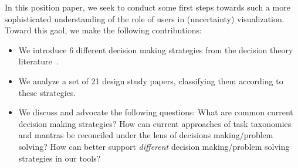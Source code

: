 In this position paper, we seek to conduct some first steps towards such a more sophisticated understanding of the role of users in 
(uncertainty) visualization. Toward this gaol, we make the following contributions:
\begin{itemize}
\item We introduce 6 different decision making strategies from the decision theory literature~\citep{Payne:1993}.
\item We analyze a set of 21 design study papers, classifying them according to these strategies.
\item We discuss and advocate the following questions: What are common current decision making strategies? How can current approaches of task taxonomies and mantras be reconciled under the lens of decisions making/problem solving? How can better support \emph{different} decision making/problem solving strategies in our tools? 
\end{itemize}
  



